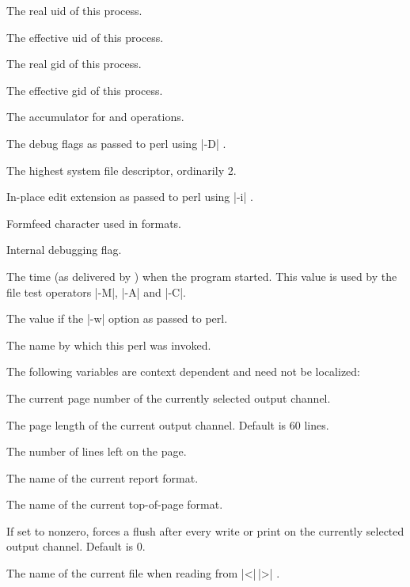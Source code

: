 \begin{enum}{1cm}
The real uid of this process.

The effective uid of this process. 

The real gid of this process.

The effective gid of this process.

The accumulator for  and  operations.\ddag

The debug flags as passed to perl using |-D| .

The highest system file descriptor, ordinarily 2.

In-place edit extension as passed to perl using |-i| .

Formfeed character used in formats.\ddag

Internal debugging flag.

The time (as delivered by ) when the program started. This
value is used by the file test operators |-M|, |-A| and |-C|.

The value if the |-w| option as passed to perl.

The name by which this perl was invoked.

\end{enum}

The following variables are context dependent and need not be
localized:

\begin{enum}{1cm}

The current page number of the currently selected output channel.

The page length of the current output channel. Default is 60 lines.

The number of lines left on the page.

The name of the current report format.

The name of the current top-of-page format.

If set to nonzero, forces a flush after every write or print on the
currently selected output channel. Default is 0. 

The name of the current file when reading from |<|\,|>| .
\end{enum}

